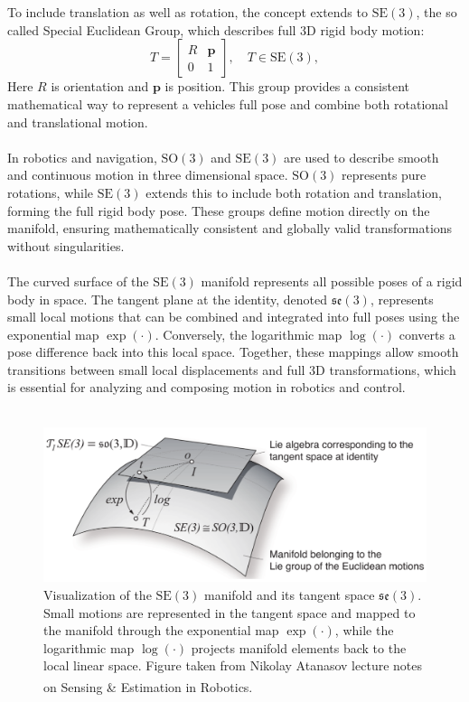 \\ \\
To include translation as well as rotation, the concept extends to $\mathrm{SE}(3)$, the so called Special Euclidean Group, which describes full 3D rigid body motion:
$$
    T =
    \begin{bmatrix}
        R & \mathbf{p} \\
        0 & 1
    \end{bmatrix},
    \quad T \in \mathrm{SE}(3),
$$
Here $R$ is orientation and $\mathbf{p}$ is position. This group provides a consistent mathematical way to represent a vehicles full pose and combine both rotational and translational motion.  
\\ \\
In robotics and navigation, $\mathrm{SO}(3)$ and $\mathrm{SE}(3)$ are used to describe smooth and continuous motion in three dimensional space. $\mathrm{SO}(3)$ represents pure rotations, while $\mathrm{SE}(3)$ extends this to include both rotation and translation, forming the full rigid body pose. These groups define motion directly on the manifold, ensuring mathematically consistent and globally valid transformations without singularities.  
\\ \\
The curved surface of the $\mathrm{SE}(3)$ manifold represents all possible poses of a rigid body in space. The tangent plane at the identity, denoted $\mathfrak{se}(3)$, represents small local motions that can be combined and integrated into full poses using the exponential map $\exp(\cdot)$. Conversely, the logarithmic map $\log(\cdot)$ converts a pose difference back into this local space. Together, these mappings allow smooth transitions between small local displacements and full 3D transformations, which is essential for analyzing and composing motion in robotics and control.  
\\ \\
\begin{figure}[H]
    \centering
    \includegraphics[width=0.8\linewidth]{Pictures/System_Modeling/Orientation_Representations/lie_group_tangent_space.png}
    \caption{Visualization of the $\mathrm{SE}(3)$ manifold and its tangent space $\mathfrak{se}(3)$. Small motions are represented in the tangent space and mapped to the manifold through the exponential map $\exp(\cdot)$, while the logarithmic map $\log(\cdot)$ projects manifold elements back to the local linear space. Figure taken from Nikolay Atanasov lecture notes on Sensing \& Estimation in Robotics.\textsuperscript{\cite{lie_groups_presentation}}}
    \label{fig:system-modeling-so3-se3}
\end{figure}
